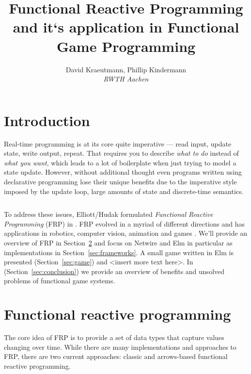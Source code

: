 \documentclass[pdftex,a4paper]{extarticle}
\title{Functional Reactive Programming and it`s application in Functional Game Programming}
\author{{\large David Kraeutmann, Phillip Kindermann} \\
{\em RWTH Aachen}}
\begin{document}
\maketitle

\section{Introduction}
Real-time programming is at its core quite imperative --- read input, update state, write output, repeat. 
That requires you to describe \emph{what to do} instead of \emph{what you want}, which leads to a lot of boilerplate when just trying to model a state update.
However, without additional thought even programs written using declarative programming lose their unique benefits due to the imperative style imposed by the update loop, large amounts of state and discrete-time semantics. 
\begin{listing}[ht]
\inputminted[breaklines=true]{haskell}{../vortrag_david/Loop.hs}
\label{lst:imperative}
\end{listing}

To address these issues, Elliott/Hudak formulated \emph{Functional Reactive Programming} (FRP) in \cite{ElliottHudak97:Fran}. FRP evolved in a myriad of different directions and has  applications in robotics, computer vision, animation and games \cite{haskell-wiki-yampa}. 
We'll provide an overview of FRP in Section~\ref{sec:frp}
and focus on Netwire and Elm in particular as implementations in Section~\ref{sec:frameworks}.
A small game written in Elm is presented (Section~\ref{sec:game}) and <insert more text here>. 
In (Section~\ref{sec:conclusion}) we provide an overview of benefits and unsolved problems of functional game systems.


\section{Functional reactive programming}
\label{sec:frp}
The core idea of FRP is to provide a set of data types that capture values changing over time. While there are many implementations and approaches to FRP, there are two current approaches: classic and arrows-based functional reactive programming. 
\end{document}
